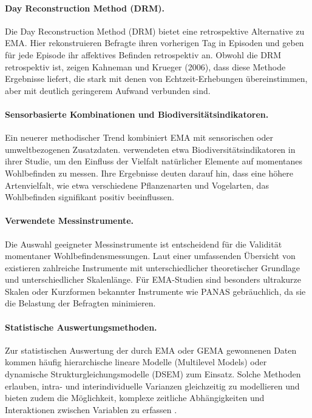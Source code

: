 \paragraph{Day Reconstruction Method (DRM).}
Die Day Reconstruction Method (DRM) bietet eine retrospektive Alternative zu EMA. Hier rekonstruieren Befragte ihren vorherigen Tag in Episoden und geben für jede Episode ihr affektives Befinden retrospektiv an. Obwohl die DRM retrospektiv ist, zeigen Kahneman und Krueger (2006), dass diese Methode Ergebnisse liefert, die stark mit denen von Echtzeit-Erhebungen übereinstimmen, aber mit deutlich geringerem Aufwand verbunden sind.

\paragraph{Sensorbasierte Kombinationen und Biodiversitätsindikatoren.}
Ein neuerer methodischer Trend kombiniert EMA mit sensorischen oder umweltbezogenen Zusatzdaten. \citet{hammoudSmartphonebasedEcologicalMomentary2024} verwendeten etwa Biodiversitätsindikatoren in ihrer Studie, um den Einfluss der Vielfalt natürlicher Elemente auf momentanes Wohlbefinden zu messen. Ihre Ergebnisse deuten darauf hin, dass eine höhere Artenvielfalt, wie etwa verschiedene Pflanzenarten und Vogelarten, das Wohlbefinden signifikant positiv beeinflussen.

\paragraph{Verwendete Messinstrumente.}
Die Auswahl geeigneter Messinstrumente ist entscheidend für die Validität momentaner Wohlbefindensmessungen. Laut einer umfassenden Übersicht von \citet{cookeMeasuringWellBeingReview2016} existieren zahlreiche Instrumente mit unterschiedlicher theoretischer Grundlage und unterschiedlicher Skalenlänge. Für EMA-Studien sind besonders ultrakurze Skalen oder Kurzformen bekannter Instrumente wie PANAS gebräuchlich, da sie die Belastung der Befragten minimieren.

\paragraph{Statistische Auswertungsmethoden.}
Zur statistischen Auswertung der durch EMA oder GEMA gewonnenen Daten kommen häufig hierarchische lineare Modelle (Multilevel Models) oder dynamische Strukturgleichungsmodelle (DSEM) zum Einsatz. Solche Methoden erlauben, intra- und interindividuelle Varianzen gleichzeitig zu modellieren und bieten zudem die Möglichkeit, komplexe zeitliche Abhängigkeiten und Interaktionen zwischen Variablen zu erfassen \citep{mascherekMeadowsAsphaltRoad2025, hammoudSmartphonebasedEcologicalMomentary2024, chenPerceivedUrbanEnvironment2025}.

